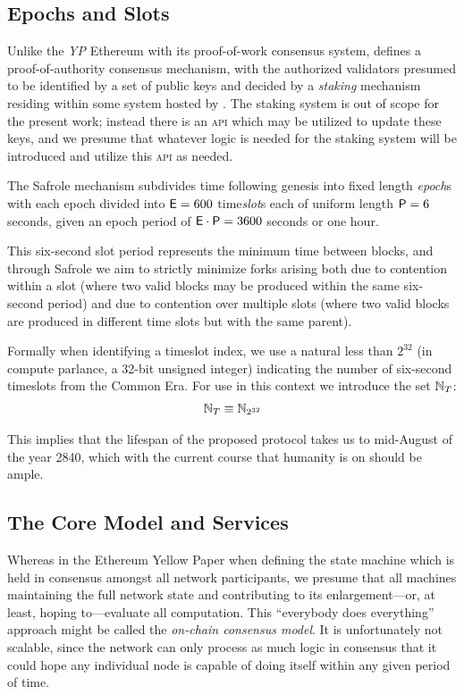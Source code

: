 \subsection{Epochs and Slots}
\label{sec:epochsandslots}

Unlike the \emph{YP} Ethereum with its proof-of-work consensus system, \Jam defines a proof-of-authority consensus mechanism, with the authorized validators presumed to be identified by a set of public keys and decided by a \emph{staking} mechanism residing within some system hosted by \Jam. The staking system is out of scope for the present work; instead there is an \textsc{api} which may be utilized to update these keys, and we presume that whatever logic is needed for the staking system will be introduced and utilize this \textsc{api} as needed.

The Safrole mechanism subdivides time following genesis into fixed length \emph{epoch}s with each epoch divided into $\mathsf{E} = 600$ time\emph{slot}s each of uniform length $\mathsf{P} = 6$ seconds, given an epoch period of $\mathsf{E}\cdot\mathsf{P} = 3600$ seconds or one hour.

This six-second slot period represents the minimum time between \Jam blocks, and through Safrole we aim to strictly minimize forks arising both due to contention within a slot (where two valid blocks may be produced within the same six-second period) and due to contention over multiple slots (where two valid blocks are produced in different time slots but with the same parent).

Formally when identifying a timeslot index, we use a natural less than $2^{32}$ (in compute parlance, a 32-bit unsigned integer) indicating the number of six-second timeslots from the \Jam Common Era. For use in this context we introduce the set $\mathbb{N}_T$:
\begin{align}\label{eq:time}
  \mathbb{N}_T \equiv \mathbb{N}_{2^{32}}
\end{align}

This implies that the lifespan of the proposed protocol takes us to mid-August of the year 2840, which with the current course that humanity is on should be ample.

\subsection{The Core Model and Services}\label{sec:coremodelandservices}

Whereas in the Ethereum Yellow Paper when defining the state machine which is held in consensus amongst all network participants, we presume that all machines maintaining the full network state and contributing to its enlargement---or, at least, hoping to---evaluate all computation. This ``everybody does everything'' approach might be called the \emph{on-chain consensus model}. It is unfortunately not scalable, since the network can only process as much logic in consensus that it could hope any individual node is capable of doing itself within any given period of time.

